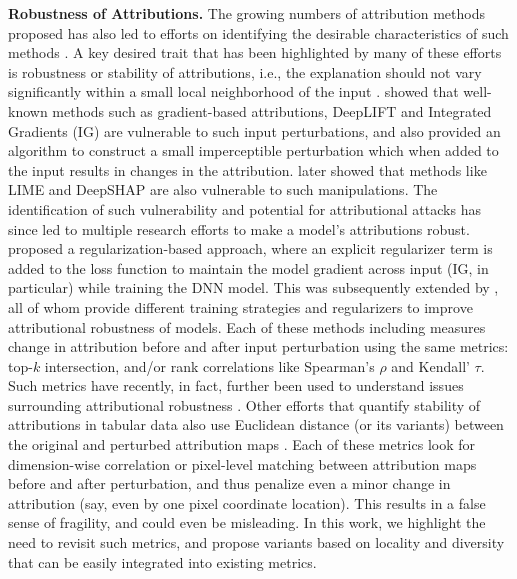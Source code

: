 \documentclass[letterpaper]{article} %
\begin{document}
\noindent \textbf{Robustness of Attributions.} The growing numbers of attribution methods proposed has also led to efforts on identifying the desirable characteristics of such methods \citep{alvarez2018robustness,AdebayoGMGHK18,yeh2019fidelity,ChalasaniC00J20,TomsettHCGP20,Boggust22Faithful,agarwal2022rethinking}. A key desired trait that has been highlighted by many of these efforts is robustness or stability of attributions, i.e., the explanation should not vary significantly within a small local neighborhood of the input \citep{alvarez2018robustness,ChalasaniC00J20}. \citet{ghorbani2018interpretation} showed that well-known methods such as gradient-based attributions, DeepLIFT \citep{shrikumar2019learning} and Integrated Gradients (IG) \citep{SundararajanTY17} are vulnerable to such input perturbations, and also provided an algorithm to construct a small imperceptible perturbation which when added to the input results in changes in the attribution.  \citet{slack2020fooling} later showed that methods like LIME \citep{ribeiro2016why} and DeepSHAP \citep{lundberg2017unified} are also vulnerable to such manipulations. The identification of such vulnerability and potential for attributional attacks has since led to multiple research efforts to make a model's attributions robust. \citet{chen2019robust} proposed a regularization-based approach, where an explicit regularizer term is added to the loss function to maintain the model gradient across input (IG, in particular) while training the DNN model. This was subsequently extended by \citep{sarkar2020enhanced,singh2020attributional,wang2020smoothed}, all of whom provide different training strategies and regularizers to improve attributional robustness of models. Each of these methods including \citet{ghorbani2018interpretation} measures change in attribution before and after input perturbation using the same metrics: top-$k$ intersection, and/or rank correlations like Spearman's $\rho$ and Kendall' $\tau$. Such metrics have recently, in fact, further been used to understand issues surrounding attributional robustness \citep{Wang22Kendall}. Other efforts that quantify stability of attributions in tabular data also use Euclidean distance (or its variants) between the original and perturbed attribution maps  \citep{alvarez2018robustness,yeh2019fidelity,agarwal2022rethinking}. Each of these metrics look for dimension-wise correlation or pixel-level matching between attribution maps before and after perturbation, and thus penalize even a minor change in attribution (say, even by one pixel coordinate location). This results in a false sense of fragility, and could even be misleading. In this work, we highlight the need to revisit such metrics, and propose variants based on locality and diversity that can be easily integrated into existing metrics. 
\end{document}
